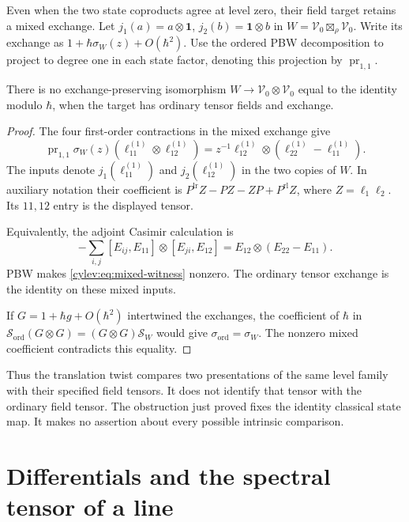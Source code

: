 Even when the two state coproducts agree at level zero, their field
target retains a mixed exchange.
Let $j_1(a)=a\otimes\mathbf1$, $j_2(b)=\mathbf1\otimes b$ in
$W=\mathcal V_0\boxtimes_\rho\mathcal V_0$.
Write its exchange as $1+\hbar\sigma_W(z)+O(\hbar^2)$.
Use the ordered PBW decomposition to project to degree one in each
state factor, denoting this projection by $\operatorname{pr}_{1,1}$.

\begin{proposition}\label{cylev:prop:ordinary-obstruction}
There is no exchange-preserving isomorphism
$W\to\mathcal V_0\otimes\mathcal V_0$ equal to the identity
modulo $\hbar$, when the target has ordinary tensor fields and exchange.
\end{proposition}
\begin{proof}
The four first-order contractions in the mixed exchange give
\begin{equation}\label{cylev:eq:mixed-witness}
 \operatorname{pr}_{1,1}\sigma_W(z)
       (\ell_{11}^{(1)}\otimes\ell_{12}^{(1)})
       =z^{-1}\ell_{12}^{(1)}\otimes
                          (\ell_{22}^{(1)}-\ell_{11}^{(1)}).
\end{equation}
The inputs denote $j_1(\ell_{11}^{(1)})$ and
$j_2(\ell_{12}^{(1)})$ in the two copies of $W$.
In auxiliary notation their coefficient is
$P^{\mathrm{lr}}Z-PZ-ZP+P^{\mathrm{rl}}Z$,
where $Z=\ell_1\ell_2$.
Its $11,12$ entry is the displayed tensor.

Equivalently, the adjoint Casimir calculation is
\[
 -\sum_{i,j}[E_{ij},E_{11}]\otimes[E_{ji},E_{12}]
       =E_{12}\otimes(E_{22}-E_{11}).
\]
PBW makes \eqref{cylev:eq:mixed-witness} nonzero.
The ordinary tensor exchange is the identity on these mixed inputs.

If $G=1+\hbar g+O(\hbar^2)$ intertwined the exchanges, the coefficient
of $\hbar$ in
$\mathcal S_{\mathrm{ord}}(G\otimes G)=(G\otimes G)\mathcal S_W$
would give $\sigma_{\mathrm{ord}}=\sigma_W$.
The nonzero mixed coefficient contradicts this equality.
\end{proof}

Thus the translation twist compares two presentations of the same
level family with their specified field tensors.
It does not identify that tensor with the ordinary field tensor.
The obstruction just proved fixes the identity classical state map.
It makes no assertion about every possible intrinsic comparison.

\section{Differentials and the spectral tensor of a line}
\label{cylev:sec:dg}


